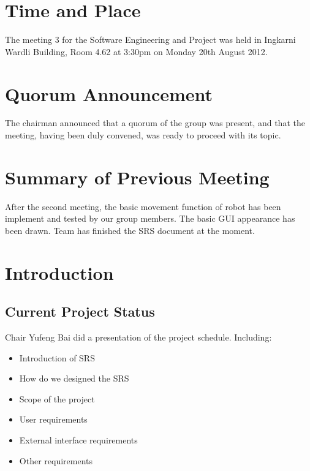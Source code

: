 \documentclass[11pt, a4paper]{article}
\begin{document}
\section{Time and Place}
The meeting 3 for the Software Engineering and Project was held in Ingkarni Wardli Building, Room 4.62 at 3:30pm on Monday 20th August 2012.

\section{Quorum Announcement}
The chairman announced that a quorum of the group was present, and that the meeting, having been duly convened, was ready to proceed with its topic.

\section{Summary of Previous Meeting}
After the second meeting, the basic movement function of robot has been implement and tested by our group members. The basic GUI appearance has been drawn. Team has finished the SRS document at the moment.


\section{Introduction}

\subsection{Current Project Status}
Chair Yufeng Bai did a presentation of the project schedule. Including:
\begin{itemize} 
\item Introduction of SRS
\item How do we designed the SRS 
\item Scope of the project
\item User requirements
\item External interface requirements
\item Other requirements
\end{itemize}
\end{document}

